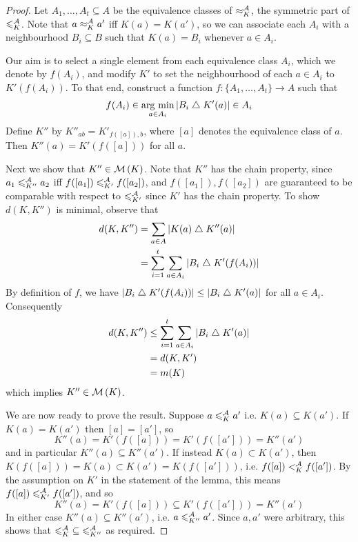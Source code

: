 \begin{proof}
    Let $A_1, \ldots, A_t \subseteq A$ be the equivalence classes of
    ${\approx^{\mathcal{A}}_K}$, the symmetric part of ${\leqslant^{\mathcal{A}}_K}$. Note that $a \approx^{\mathcal{A}}_K a'$
    iff $K(a) = K(a')$, so we can associate each $A_i$ with a neighbourhood
    $B_i \subseteq B$ such that $K(a) = B_i$ whenever $a \in A_i$.

    Our aim is to select a single element from each equivalence class $A_i$,
    which we denote by $f(A_i)$, and modify $K'$ to set the neighbourhood of
    each $a \in A_i$ to $K'(f(A_i))$. To that end, construct a function $f:
    \{A_1,\ldots,A_t\} \to A$ such that
    \[
        f(A_i) \in \operatorname*{arg\ min}_{a \in A_i}{|B_i \mathrel{\triangle} K'(a)|} \in A_i
    \]
    Define $K''$ by $K''_{ab} = K'_{f([a]), b}$, where $[a]$ denotes the
    equivalence class of $a$. Then $K''(a) = K'(f([a]))$ for all $a$.

    Next we show that $K'' \in \operatorname{\mathcal{M}}\left({K}\right)$. Note that $K''$ has the chain
    property, since $a_1 \leqslant^{\mathcal{A}}_{K''} a_2$ iff $f([a_1]) \leqslant^{\mathcal{A}}_{K'} f([a_2])$,
    and $f([a_1]), f([a_2])$ are guaranteed to be comparable with respect to
    ${\leqslant^{\mathcal{A}}_{K'}}$ since $K'$ has the chain property. To show $d(K, K'')$ is
    minimal, observe that
    \begin{align*}
        d(K, K'')
        &= \sum_{a \in A}{|K(a) \mathrel{\triangle} K''(a)|} \\
        &= \sum_{i=1}^{t}{
            \sum_{a \in A_i}{
                |B_i \mathrel{\triangle} K'(f(A_i))|
            }
        }
    \end{align*}
    By definition of $f$, we have $|B_i \mathrel{\triangle} K'(f(A_i))| \le |B_i \mathrel{\triangle}
    K'(a)|$ for all $a \in A_i$. Consequently
    \begin{align*}
        d(K, K'')
        &\le \sum_{i=1}^{t}{
            \sum_{a \in A_i}{
                |B_i \mathrel{\triangle} K'(a)|
            }
        } \\
        &= d(K, K') \\
        &= m({K})
    \end{align*}
    which implies $K'' \in \operatorname{\mathcal{M}}\left({K}\right)$.

    We are now ready to prove the result. Suppose $a \leqslant^{\mathcal{A}}_K a'$ i.e. $K(a)
    \subseteq K(a')$. If $K(a) = K(a')$ then $[a] = [a']$, so
    \[
        K''(a) = K'(f([a])) = K'(f([a'])) = K''(a')
    \]
    and in particular $K''(a) \subseteq K''(a')$. If instead $K(a) \subset
    K(a')$, then $K(f([a])) = K(a) \subset K(a') = K(f([a']))$, i.e.  $f([a])
    <^{\mathcal{A}}_K f([a'])$. By the assumption on $K'$ in the statement of the lemma,
    this means $f([a]) \leqslant^{\mathcal{A}}_{K'} f([a'])$, and so
    \[
        K''(a) = K'(f([a])) \subseteq K'(f([a'])) = K''(a')
    \]
    In either case $K''(a) \subseteq K''(a')$, i.e. $a \leqslant^{\mathcal{A}}_{K''} a'$. Since
    $a, a'$ were arbitrary, this shows that ${\leqslant^{\mathcal{A}}_K} \subseteq {\leqslant^{\mathcal{A}}_{K''}}$
    as required.
\end{proof}


